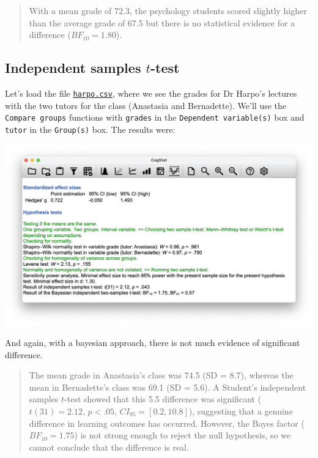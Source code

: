 \documentclass[
]{book}
\theoremstyle{definition}
\theoremstyle{definition}
\theoremstyle{definition}
\theoremstyle{definition}
\theoremstyle{remark}
\begin{document}
\begin{quote}
With a mean grade of 72.3, the psychology students scored slightly higher than the average grade of 67.5 but there is no statistical evidence for a difference (\(BF_{10} = 1.80\)).
\end{quote}

\hypertarget{independent-samples-t-test}{%
\subsection{\texorpdfstring{Independent samples \(t\)-test}{Independent samples t-test}}\label{independent-samples-t-test}}

Let's load the file \href{resources/data/harpo.csv}{\texttt{harpo.csv}}, where we see the grades for Dr Harpo's lectures with the two tutors for the class (Anastasia and Bernadette). We'll use the \texttt{Compare\ groups} functions with \texttt{grades} in the \texttt{Dependent\ variable(s)} box and \texttt{tutor} in the \texttt{Group(s)} box. The results were:

\begin{center}\includegraphics[width=0.66\linewidth]{resources/image/cogstatharpohypo} \end{center}

And again, with a bayesian approach, there is not much evidence of significant difference.

\begin{quote}
The mean grade in Anastasia's class was 74.5 (SD = 8.7), whereas the mean in Bernadette's class was 69.1 (SD = 5.6). A Student's independent samples \(t\)-test showed that this 5.5 difference was significant (\(t(31) = 2.12\), \(p<.05\), \(CI_{95} = [0.2, 10.8]\)), suggesting that a genuine difference in learning outcomes has occurred. However, the Bayes factor (\(BF_{10} = 1.75\)) is not strong enough to reject the null hypothesis, so we cannot conclude that the difference is real.
\end{quote}
\end{document}
